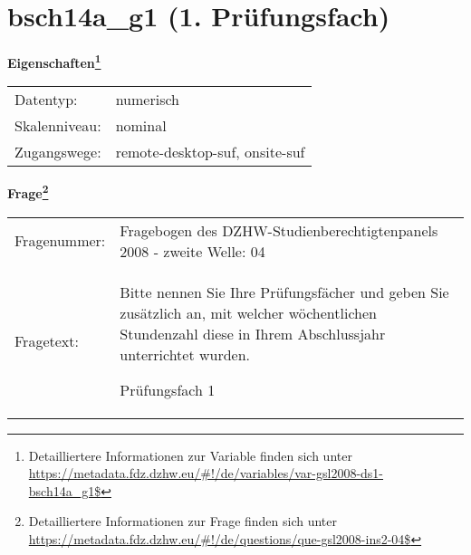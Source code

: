 
    \setcounter{footnote}{0}

    \vspace*{-1.8cm}
	\section{bsch14a\_g1 (1. Prüfungsfach)}
	\label{section:bsch14a_g1}



    \vspace*{0.5cm}
    \noindent\textbf{Eigenschaften\footnote{Detailliertere Informationen zur Variable finden sich unter
		\url{https://metadata.fdz.dzhw.eu/\#!/de/variables/var-gsl2008-ds1-bsch14a_g1$}}}\\
	\begin{tabularx}{\hsize}{@{}lX}
	Datentyp: & numerisch \\
	Skalenniveau: & nominal \\
	Zugangswege: &
	  remote-desktop-suf, 
	  onsite-suf
 \\
    \end{tabularx}



				\vspace*{0.5cm}
                \noindent\textbf{Frage\footnote{Detailliertere Informationen zur Frage finden sich unter
		              \url{https://metadata.fdz.dzhw.eu/\#!/de/questions/que-gsl2008-ins2-04$}}}\\
				\begin{tabularx}{\hsize}{@{}lX}
					Fragenummer: &
					  Fragebogen des DZHW-Studienberechtigtenpanels 2008 - zweite Welle:
					  04
 \\
					Fragetext: & Bitte nennen Sie Ihre Prüfungsfächer und geben Sie zusätzlich an, mit welcher wöchentlichen Stundenzahl diese in Ihrem Abschlussjahr unterrichtet wurden.\par  Prüfungsfach 1 \\
				\end{tabularx}





